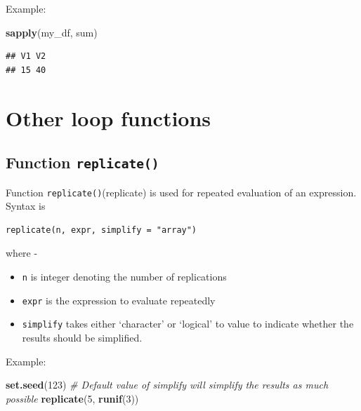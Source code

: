 \documentclass[
]{book}
\newenvironment{Shaded}{\begin{snugshade}}{\end{snugshade}}
\newcommand{\CommentTok}[1]{\textcolor[rgb]{0.56,0.35,0.01}{\textit{#1}}}
\newcommand{\DecValTok}[1]{\textcolor[rgb]{0.00,0.00,0.81}{#1}}
\newcommand{\FunctionTok}[1]{\textcolor[rgb]{0.13,0.29,0.53}{\textbf{#1}}}
\newcommand{\NormalTok}[1]{#1}
\providecommand{\tightlist}{%
  \setlength{\itemsep}{0pt}\setlength{\parskip}{0pt}}
\begin{document}
Example:

\begin{Shaded}
\begin{Highlighting}[]
\FunctionTok{sapply}\NormalTok{(my\_df, sum)}
\end{Highlighting}
\end{Shaded}

\begin{verbatim}
## V1 V2 
## 15 40
\end{verbatim}

\hypertarget{other-loop-functions}{%
\section{Other loop functions}\label{other-loop-functions}}

\hypertarget{function-replicate}{%
\subsection{\texorpdfstring{Function \texttt{replicate()}}{Function replicate()}}\label{function-replicate}}

Function \texttt{replicate()}\index(replicate) is used for repeated evaluation of an expression. Syntax is

\begin{verbatim}
replicate(n, expr, simplify = "array")
\end{verbatim}

where -

\begin{itemize}
\tightlist
\item
  \texttt{n} is integer denoting the number of replications
\item
  \texttt{expr} is the expression to evaluate repeatedly
\item
  \texttt{simplify} takes either `character' or `logical' to value to indicate whether the results should be simplified.
\end{itemize}

Example:

\begin{Shaded}
\begin{Highlighting}[]
\FunctionTok{set.seed}\NormalTok{(}\DecValTok{123}\NormalTok{)}
\CommentTok{\# Default value of simplify will simplify the results as much possible}
\FunctionTok{replicate}\NormalTok{(}\DecValTok{5}\NormalTok{, }\FunctionTok{runif}\NormalTok{(}\DecValTok{3}\NormalTok{))}
\end{Highlighting}
\end{Shaded}
\end{document}
